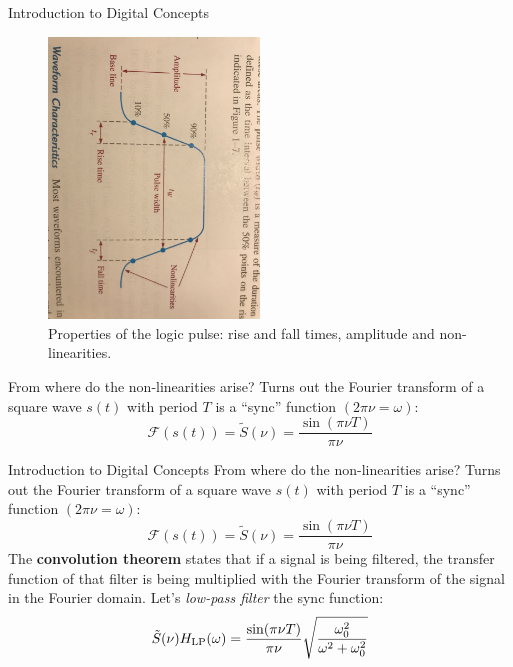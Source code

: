 \documentclass{beamer}
\begin{document}
\begin{frame}{Introduction to Digital Concepts}
\begin{figure}
\centering
\includegraphics[width=0.5\textwidth,trim=1cm 7cm 0cm 9cm,clip=true]{figures/pulse.jpg}
\caption{\label{fig:pulse} Properties of the logic pulse: rise and fall times, amplitude and non-linearities.}
\end{figure}
From where do the non-linearities arise? Turns out the Fourier transform of a square wave $s(t)$ with period $T$ is a ``sync'' function $(2\pi\nu = \omega)$:
\begin{equation}
\mathcal{F}(s(t)) = \tilde{S}(\nu) = \frac{\sin(\pi\nu T)}{\pi\nu}
\end{equation}
\end{frame}

\begin{frame}{Introduction to Digital Concepts}
From where do the non-linearities arise? Turns out the Fourier transform of a square wave $s(t)$ with period $T$ is a ``sync'' function $(2\pi\nu = \omega)$:
\begin{equation}
\mathcal{F}(s(t)) = \tilde{S}(\nu) = \frac{\sin(\pi\nu T)}{\pi\nu}
\end{equation}
The \textbf{convolution theorem} states that if a signal is being filtered, the transfer function of that filter is being multiplied with the Fourier transform of the signal in the Fourier domain.  Let's \textit{low-pass filter} the sync function:
\begin{equation}
\tilde{S}(\nu)H_{\rm LP}(\omega) = \frac{\sin(\pi\nu T)}{\pi\nu}\sqrt{\frac{\omega_0^2}{\omega^2+\omega_0^2}}
\end{equation}
\end{frame}
\end{document}
